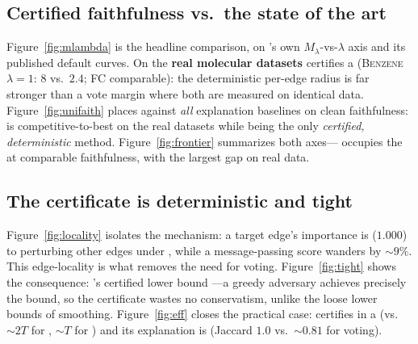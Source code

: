 \subsection{Certified faithfulness vs.\ the state of the art}
\label{sec:exp-headline}
Figure~\ref{fig:mlambda} is the headline comparison, on \xgn{}'s own
$M_\lambda$-vs-$\lambda$ axis and its published default curves. On the
\textbf{real molecular datasets} \aeth{} certifies a  (\textsc{Benzene} $\lambda{=}1$: $8$ vs.\ $2.4$;
\textsc{FC} comparable): the deterministic per-edge radius is far stronger than a
vote margin where both are measured on identical data. 
Figure~\ref{fig:unifaith} places \aeth{} against \emph{all} explanation
baselines on clean faithfulness: \aeth{} is competitive-to-best on the real
datasets while being the only \emph{certified, deterministic} method.
Figure~\ref{fig:frontier} summarizes both axes---\aeth{} occupies the
 at comparable faithfulness, with the
largest gap on real data.

\subsection{The certificate is deterministic and tight}
\label{sec:exp-cert}
Figure~\ref{fig:locality} isolates the mechanism: a target edge's importance is
 ($1.000$) to perturbing other edges under \aeth{}, while
a message-passing score \textcolor{vinfomag}{wanders by $\sim9\%$}. This
edge-locality is what removes the need for voting. Figure~\ref{fig:tight} shows
the consequence: \aeth{}'s certified lower bound ---a greedy adversary achieves precisely the
bound, so the certificate wastes no conservatism, unlike the loose lower bounds
of smoothing. Figure~\ref{fig:eff} closes the practical case: \aeth{} certifies
in a  (vs.\ $\sim\!2T$ for \xgn{}, $\sim\!T$ for
\pgn{}) and its explanation is  (Jaccard $1.0$ vs.\
$\sim0.81$ for voting).

